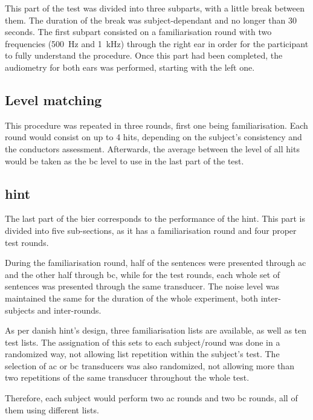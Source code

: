 This part of the test was divided into three subparts, with a little break between them. The duration of the break was subject-dependant and no longer than 30 seconds.
The first subpart consisted on a familiarisation round with two frequencies (\SI{500}{\hertz} and \SI{1}{\kilo\hertz}) through the right ear in order for the participant to fully understand the procedure. Once this part had been completed, the audiometry for both ears was performed, starting with the left one.

\subsection{Level matching}



This procedure was repeated in three rounds, first one being familiarisation. Each round would consist on up to 4 hits, depending on the subject's consistency and the conductors assessment. Afterwards, the average between the level of all hits would be taken as the \gls{bc} level to use in the last part of the test.



\subsection{\gls{hint}}
The last part of the \gls{bier} corresponds to the performance of the \gls{hint}. This part is divided into five sub-sections, as it has a familiarisation round and four proper test rounds.

During the familiarisation round, half of the sentences were presented through \gls{ac} and the other half through \gls{bc}, while for the test rounds, each whole set of sentences was presented through the same transducer. The noise level was maintained the same for the duration of the whole experiment, both inter-subjects and inter-rounds.

As per danish \gls{hint}'s design, three familiarisation lists are available, as well as ten test lists. The assignation of this sets to each subject/round was done in a randomized way, not allowing list repetition within the subject's test. The selection of \gls{ac} or \gls{bc} transducers was also randomized, not allowing more than two repetitions of the same transducer throughout the whole test.

Therefore, each subject would perform two \gls{ac} rounds and two \gls{bc} rounds, all of them using different lists.